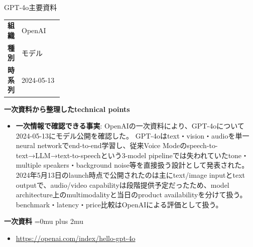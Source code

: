 \Needspace{0.38\textheight}
\begin{technicalnote}{GPT-4o}{主要資料}
\begingroup
\begin{tabularx}{\linewidth}{@{}>{\bfseries}p{0.22\linewidth}X@{}}
組織 & OpenAI \\
種別 & モデル \\
時系列 & 2024-05-13 \\
\end{tabularx}
\smallskip
\begin{minipage}{\linewidth}
{\bfseries 一次資料から整理したtechnical points}
\begin{itemize}[leftmargin=1.5em,itemsep=0.35em]
\item \textbf{一次情報で確認できる事実}: OpenAIの一次資料により、GPT-4oについて2024-05-13にモデル公開を確認した。 GPT-4oはtext・vision・audioを単一neural networkでend-to-end学習し、従来Voice Modeのspeech-to-text→LLM→text-to-speechという3-model pipelineでは失われていたtone・multiple speakers・background noise等を直接扱う設計として発表された。2024年5月13日のlaunch時点で公開されたのは主にtext/image inputとtext outputで、audio/video capabilityは段階提供予定だったため、model architecture上のmultimodalityと当日のproduct availabilityを分けて扱う。benchmark・latency・price比較はOpenAIによる評価として扱う。
\end{itemize}
\begin{minipage}{\linewidth}
\begin{samepage}
{\bfseries 一次資料}
\begingroup\sloppy
\Urlmuskip=0mu plus 2mu\relax
\begin{itemize}[leftmargin=1.5em,itemsep=0.25em]
\item {\scriptsize\url{https://openai.com/index/hello-gpt-4o}}
\end{itemize}
\endgroup
\end{samepage}
\end{minipage}
\end{minipage}
\endgroup
\end{technicalnote}
\medskip

